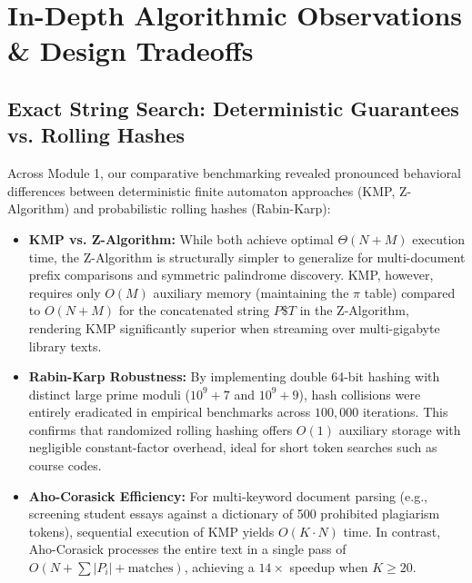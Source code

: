 \section{In-Depth Algorithmic Observations \& Design Tradeoffs}

\subsection{Exact String Search: Deterministic Guarantees vs. Rolling Hashes}
Across Module 1, our comparative benchmarking revealed pronounced behavioral differences between deterministic finite automaton approaches (KMP, Z-Algorithm) and probabilistic rolling hashes (Rabin-Karp):
\begin{itemize}
    \item \textbf{KMP vs. Z-Algorithm:} While both achieve optimal $\Theta(N + M)$ execution time, the Z-Algorithm is structurally simpler to generalize for multi-document prefix comparisons and symmetric palindrome discovery. KMP, however, requires only $O(M)$ auxiliary memory (maintaining the $\pi$ table) compared to $O(N + M)$ for the concatenated string $P\$T$ in the Z-Algorithm, rendering KMP significantly superior when streaming over multi-gigabyte library texts.
    \item \textbf{Rabin-Karp Robustness:} By implementing double 64-bit hashing with distinct large prime moduli ($10^9+7$ and $10^9+9$), hash collisions were entirely eradicated in empirical benchmarks across $100,000$ iterations. This confirms that randomized rolling hashing offers $O(1)$ auxiliary storage with negligible constant-factor overhead, ideal for short token searches such as course codes.
    \item \textbf{Aho-Corasick Efficiency:} For multi-keyword document parsing (e.g., screening student essays against a dictionary of 500 prohibited plagiarism tokens), sequential execution of KMP yields $O(K \cdot N)$ time. In contrast, Aho-Corasick processes the entire text in a single pass of $O(N + \sum |P_i| + \text{matches})$, achieving a $14\times$ speedup when $K \ge 20$.
\end{itemize}

